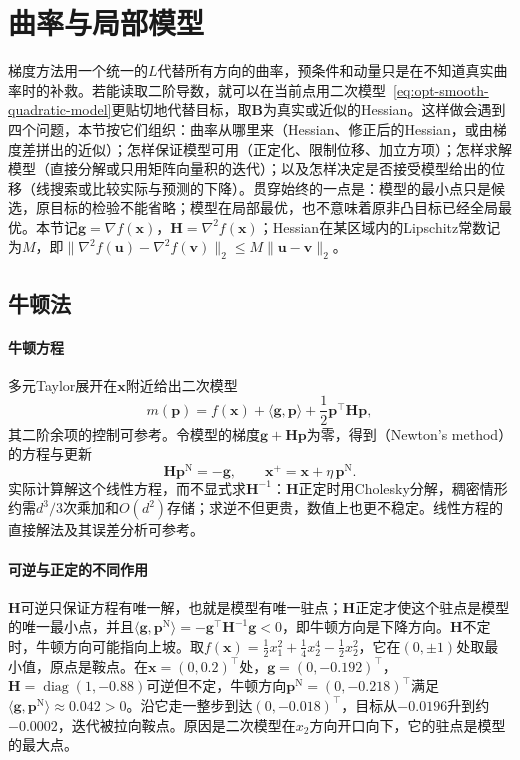 \section{曲率与局部模型}
\label{sec:opt-smooth-local-models}

梯度方法用一个统一的$L$代替所有方向的曲率，预条件和动量只是在不知道真实曲率时的补救。若能读取二阶导数，就可以在当前点用二次模型~\eqref{eq:opt-smooth-quadratic-model}更贴切地代替目标，取$\bm B$为真实或近似的Hessian。这样做会遇到四个问题，本节按它们组织：曲率从哪里来（Hessian、修正后的Hessian，或由梯度差拼出的近似）；怎样保证模型可用（正定化、限制位移、加立方项）；怎样求解模型（直接分解或只用矩阵向量积的迭代）；以及怎样决定是否接受模型给出的位移（线搜索或比较实际与预测的下降）。贯穿始终的一点是：模型的最小点只是候选，原目标的检验不能省略；模型在局部最优，也不意味着原非凸目标已经全局最优。本节记$\bm g=\nabla f(\bm x)$，$\bm H=\nabla^2 f(\bm x)$；Hessian在某区域内的Lipschitz常数记为$M$，即$\lVert\nabla^2f(\bm u)-\nabla^2f(\bm v)\rVert_2\leq M\lVert\bm u-\bm v\rVert_2$。

\subsection{牛顿法}
\label{sec:opt-smooth-newton}

\paragraph{牛顿方程}
多元Taylor展开在$\bm x$附近给出二次模型
\[
  m(\bm p)=f(\bm x)+\langle\bm g,\bm p\rangle+\frac12\bm p^\top\bm H\bm p,
\]
其二阶余项的控制可参考。令模型的梯度$\bm g+\bm H\bm p$为零，得到（Newton's method）的方程与更新
\begin{equation}
\label{eq:opt-smooth-newton}
  \bm H\bm p^{\mathrm N}=-\bm g,\qquad \bm x^+=\bm x+\eta\,\bm p^{\mathrm N}.
\end{equation}
实际计算解这个线性方程，而不显式求$\bm H^{-1}$：$\bm H$正定时用Cholesky分解，稠密情形约需$d^3/3$次乘加和$O(d^2)$存储；求逆不但更贵，数值上也更不稳定。线性方程的直接解法及其误差分析可参考。

\paragraph{可逆与正定的不同作用}
$\bm H$可逆只保证方程有唯一解，也就是模型有唯一驻点；$\bm H$正定才使这个驻点是模型的唯一最小点，并且$\langle\bm g,\bm p^{\mathrm N}\rangle=-\bm g^\top\bm H^{-1}\bm g<0$，即牛顿方向是下降方向。$\bm H$不定时，牛顿方向可能指向上坡。取$f(\bm x)=\tfrac12x_1^2+\tfrac14x_2^4-\tfrac12x_2^2$，它在$(0,\pm1)$处取最小值，原点是鞍点。在$\bm x=(0,0.2)^\top$处，$\bm g=(0,-0.192)^\top$，$\bm H=\operatorname{diag}(1,-0.88)$可逆但不定，牛顿方向$\bm p^{\mathrm N}=(0,-0.218)^\top$满足$\langle\bm g,\bm p^{\mathrm N}\rangle\approx0.042>0$。沿它走一整步到达$(0,-0.018)^\top$，目标从$-0.0196$升到约$-0.0002$，迭代被拉向鞍点。原因是二次模型在$x_2$方向开口向下，它的驻点是模型的最大点。

